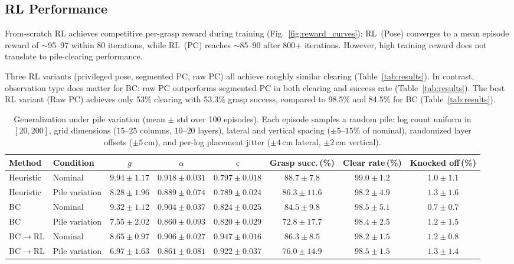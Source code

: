 \documentclass[conference]{IEEEtran}
\begin{document}
\subsection{RL Performance}
\label{sec:rl_perf}
From-scratch RL achieves competitive per-grasp reward during training (Fig.~\ref{fig:reward_curves}): RL~(Pose) converges to a mean episode reward of $\sim$95--97 within 80 iterations, while RL~(PC) reaches $\sim$85--90 after 800+ iterations.
However, high training reward does not translate to pile-clearing performance.

Three RL variants (privileged pose, segmented PC, raw PC) all achieve roughly similar clearing (Table~\ref{tab:results}).
In contrast, observation type does matter for BC: raw PC outperforms segmented PC in both clearing and success rate (Table~\ref{tab:results}).
The best RL variant (Raw PC) achieves only 53\% clearing with 53.3\% grasp success, compared to 98.5\% and 84.5\% for BC (Table~\ref{tab:results}).

\begin{table}[t]
\centering
\caption{Generalization under pile variation (mean $\pm$ std over 100 episodes). Each episode samples a random pile: log count uniform in $[20, 200]$, grid dimensions ($15$--$25$ columns, $10$--$20$ layers), lateral and vertical spacing ($\pm 5$--$15$\% of nominal), randomized layer offsets ($\pm 5$\,cm), and per-log placement jitter ($\pm 4$\,cm lateral, $\pm 2$\,cm vertical).}
\label{tab:robustness}
\setlength{\tabcolsep}{5pt}
\begin{tabular}{@{}llcccccc@{}}
\toprule
Method & Condition & $g$ & $\alpha$ & $\varsigma$ & Grasp succ.\,(\%) & Clear rate\,(\%) & Knocked off\,(\%) \\
\midrule
Heuristic & Nominal        & $9.94 \pm 1.17$ & $0.918 \pm 0.031$ & $0.797 \pm 0.018$ & $88.7 \pm 7.8$  & $99.0 \pm 1.2$ & $1.0 \pm 1.1$ \\
Heuristic & Pile variation & $8.28 \pm 1.96$ & $0.889 \pm 0.074$ & $0.789 \pm 0.024$ & $86.3 \pm 11.6$ & $98.2 \pm 4.9$ & $1.3 \pm 1.6$ \\
\addlinespace
BC        & Nominal        & $9.32 \pm 1.12$ & $0.904 \pm 0.037$ & $0.824 \pm 0.025$ & $84.5 \pm 9.8$  & $98.5 \pm 5.1$ & $0.7 \pm 0.7$ \\
BC        & Pile variation & $7.55 \pm 2.02$ & $0.860 \pm 0.093$ & $0.820 \pm 0.029$ & $72.8 \pm 17.7$ & $98.4 \pm 2.5$ & $1.2 \pm 1.5$ \\
\addlinespace
BC$\to$RL & Nominal        & $8.65 \pm 0.97$ & $0.906 \pm 0.027$ & $0.947 \pm 0.016$ & $86.3 \pm 8.5$  & $98.2 \pm 1.5$ & $1.2 \pm 0.8$ \\
BC$\to$RL & Pile variation & $6.97 \pm 1.63$ & $0.861 \pm 0.081$ & $0.922 \pm 0.037$ & $76.0 \pm 14.9$ & $98.5 \pm 1.5$ & $1.3 \pm 1.4$ \\
\bottomrule
\end{tabular}
\end{table}
\end{document}
